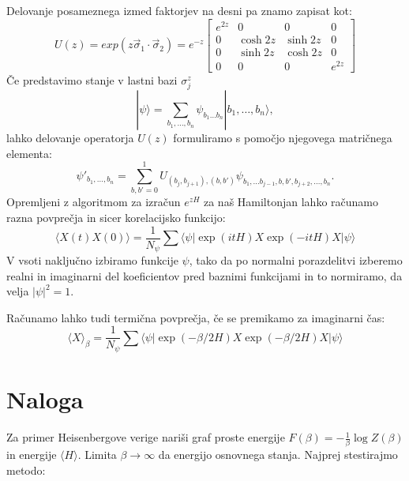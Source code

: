 \documentclass{article}
\begin{document}
Delovanje posameznega izmed faktorjev na desni pa znamo zapisat kot:
\begin{equation*}
U(z) = exp(z \vec{\sigma}_1 \cdot \vec{\sigma}_2) = e^{-z}
\begin{bmatrix}
e^{2z} & 0 & 0 & 0 \\
0 & \cosh 2z & \sinh 2z & 0 \\
0 & \sinh 2z & \cosh 2z & 0 \\
0 & 0 & 0 & e^{2z} 
\end{bmatrix}
\end{equation*}
Če predstavimo stanje v lastni bazi $\sigma_j^z$ 
\begin{equation*}
|\psi \rangle = \sum_{b_1, \dots , b_n} \psi_{b_1 \dots b_n} |b_1, \dots, b_n \rangle,
\end{equation*}
lahko delovanje operatorja $U(z)$ formuliramo s pomočjo njegovega matričnega elementa:
\begin{equation*}
\psi'_{b_1, \dots , b_n} = \sum_{b, b' = 0}^1 U_{(b_j,b_{j+1}),(b,b')} \psi_{b_1, \dots b_{j-1}, b, b' , b_{j+2}, \dots, b_n}.
\end{equation*}
Opremljeni z algoritmom za izračun $e^{zH}$ za naš Hamiltonjan lahko računamo razna povprečja in sicer korelacijsko funkcijo:
\begin{equation*}
\langle X(t) X(0) \rangle = \frac{1}{N_\psi} \sum \langle \psi | \exp (i t H) X \exp (-i t H) X | \psi \rangle
\end{equation*}
V vsoti naključno izbiramo funkcije $\psi$, tako da po normalni porazdelitvi izberemo realni in imaginarni del koeficientov pred baznimi funkcijami in to normiramo, da velja $|\psi|^2 = 1$.

Računamo lahko tudi termična povprečja, če se premikamo za imaginarni čas:
\begin{equation*}
\langle X \rangle_\beta = \frac{1}{N_\psi} \sum \langle \psi | \exp (-\beta/2 H) X \exp (-\beta/2 H) X | \psi \rangle
\end{equation*}

\section*{Naloga}
Za primer Heisenbergove verige nariši graf proste energije $F(\beta) = -\frac{1}{\beta} \log Z(\beta)$ in energije $\langle H \rangle$. Limita $\beta \to \infty$ da energijo osnovnega stanja.
Najprej stestirajmo metodo:
\end{document}
